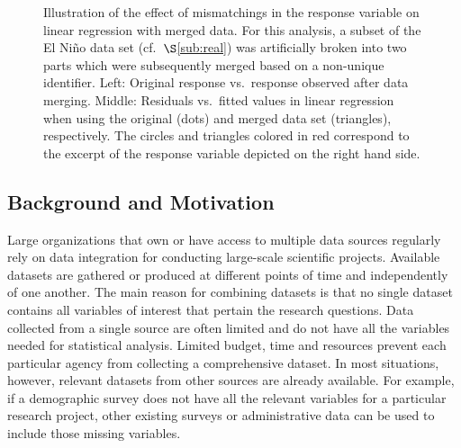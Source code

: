 \documentclass[11pt]{article}
\def\y{\mathbf{y}}
\begin{document}
\begin{figure}
   \caption{Illustration of the effect of mismatchings in the response variable on linear regression with merged data.
     For this analysis, a subset of the El Ni\~no data set (cf.~$\S$\ref{sub:real}) was artificially broken  into two parts which were subsequently merged based on a non-unique identifier. Left: Original response vs.~response observed after data merging. Middle: Residuals vs.~fitted values in linear regression when using the original (dots) and merged data set (triangles), respectively. The circles and triangles colored in red correspond to the excerpt of the response variable depicted on the right hand side.}\label{fig:motivation_elnino}
\end{figure}


\subsection{Background and Motivation}
Large organizations that own or have access to multiple data sources regularly rely on data integration for conducting large-scale scientific projects. Available datasets are gathered or produced at different points of time and independently of one another. The main reason for combining datasets is that no single dataset contains all variables of interest that pertain the research questions. Data collected from a single source are often limited and do not have all the variables needed for statistical analysis. Limited budget, time and resources prevent each particular agency from collecting a comprehensive dataset. In most situations, however, relevant datasets from other sources are already available. For example, if a demographic survey does not have all the relevant variables for a particular research project, other existing surveys or administrative data can be used to include those missing variables.
\end{document}

